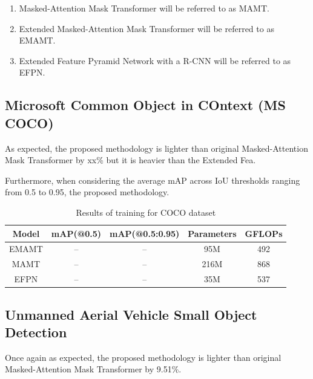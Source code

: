 \begin{enumerate}
    \item Masked-Attention Mask Transformer will be referred to as MAMT.
    \item Extended Masked-Attention Mask Transformer will be referred to as EMAMT.
    \item Extended Feature Pyramid Network with a R-CNN will be referred to as EFPN.
\end{enumerate}


\subsection{Microsoft Common Object in COntext (MS COCO)}
As expected, the proposed methodology is lighter than original Masked-Attention Mask Transformer by xx\% but it is heavier than the Extended Fea. 

Furthermore, when considering the average mAP across IoU thresholds ranging
from 0.5 to 0.95, the proposed methodology.


\begin{table}[h]
    \centering
    \begin{tabular}{|c|c|c|c|c|}
        \hline
        \textbf{Model}     & \textbf{mAP(@0.5)}     & \textbf{mAP(@0.5:0.95)}  & \textbf{Parameters} & \textbf{GFLOPs}  \\ \hline
        EMAMT              & --                     & --                       & 95M                 &  492             \\ \hline
        MAMT               & --                     & --                       & 216M                &  868             \\ \hline
        EFPN               & --                     & --                       & 35M                 &  537             \\ \hline
    \end{tabular}
    \caption{Results of training for COCO dataset}
    \label{tab:coco_results}
\end{table}



\subsection{Unmanned Aerial Vehicle Small Object Detection}

Once again as expected, the proposed methodology is lighter than original Masked-Attention Mask Transformer by 9.51\%. 

